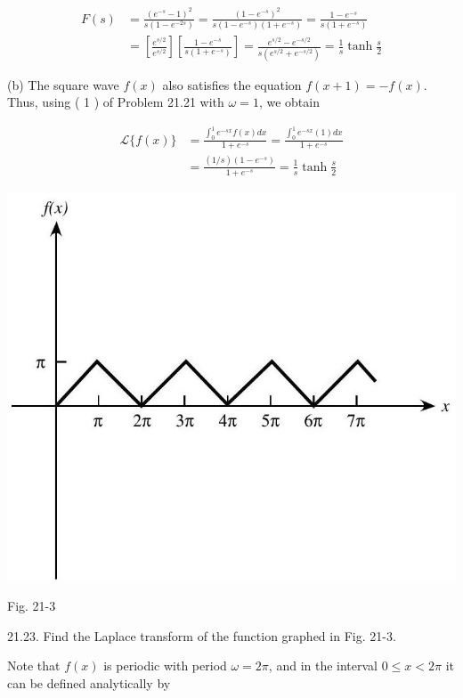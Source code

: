 \documentclass[10pt]{article}
\begin{document}
$$
\begin{aligned}
F(s) & =\frac{\left(e^{-s}-1\right)^{2}}{s\left(1-e^{-2 s}\right)}=\frac{\left(1-e^{-s}\right)^{2}}{s\left(1-e^{-s}\right)\left(1+e^{-s}\right)}=\frac{1-e^{-s}}{s\left(1+e^{-s}\right)} \\
& =\left[\frac{e^{s / 2}}{e^{s / 2}}\right]\left[\frac{1-e^{-s}}{s\left(1+e^{-s}\right)}\right]=\frac{e^{s / 2}-e^{-s / 2}}{s\left(e^{s / 2}+e^{-s / 2}\right)}=\frac{1}{s} \tanh \frac{s}{2}
\end{aligned}
$$

(b) The square wave $f(x)$ also satisfies the equation $f(x+1)=-f(x)$. Thus, using ( 1 ) of Problem 21.21 with $\omega=1$, we obtain

$$
\begin{aligned}
\mathscr{L}\{f(x)\} & =\frac{\int_{0}^{1} e^{-s x} f(x) d x}{1+e^{-s}}=\frac{\int_{0}^{1} e^{-s x}(1) d x}{1+e^{-s}} \\
& =\frac{(1 / s)\left(1-e^{-s}\right)}{1+e^{-s}}=\frac{1}{s} \tanh \frac{s}{2}
\end{aligned}
$$

\begin{center}
\includegraphics[max width=\textwidth]{2024_04_03_5bb5b4275a64cb9887d1g-237}
\end{center}

Fig. 21-3

21.23. Find the Laplace transform of the function graphed in Fig. 21-3.

Note that $f(x)$ is periodic with period $\omega=2 \pi$, and in the interval $0 \leq x<2 \pi$ it can be defined analytically by
\end{document}
